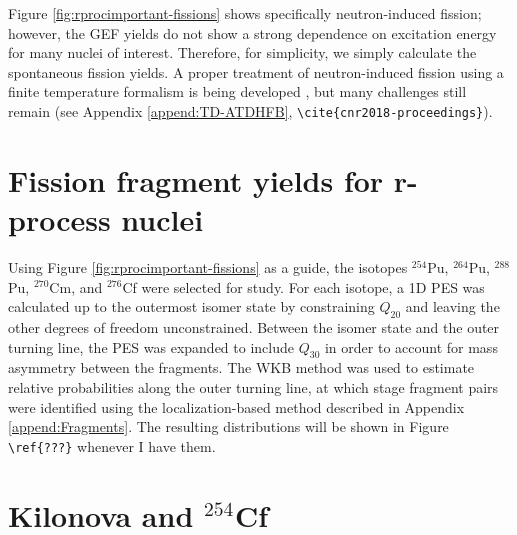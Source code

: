 Figure \ref{fig:rprocimportant-fissions} shows specifically neutron-induced fission; however, the GEF yields do not show a strong dependence on excitation energy for many nuclei of interest. Therefore, for simplicity, we simply calculate the spontaneous fission yields. A proper treatment of neutron-induced fission using a finite temperature formalism is being developed \cite{Mcdonnell2014, Schunck2014, Schunck2015b}, but many challenges still remain (see Appendix \ref{append:TD-ATDHFB}, \verb|\cite{cnr2018-proceedings}|).


\section{Fission fragment yields for r-process nuclei}

Using Figure \ref{fig:rprocimportant-fissions} as a guide, the isotopes $^{254}$Pu, $^{264}$Pu, $^{288}$Pu, $^{270}$Cm, and $^{276}$Cf were selected for study. For each isotope, a 1D PES was calculated up to the outermost isomer state by constraining $Q_{20}$ and leaving the other degrees of freedom unconstrained. Between the isomer state and the outer turning line, the PES was expanded to include $Q_{30}$ in order to account for mass asymmetry between the fragments. The WKB method was used to estimate relative probabilities along the outer turning line, at which stage fragment pairs were identified using the localization-based method described in Appendix \ref{append:Fragments}. The resulting distributions will be shown in Figure \verb|\ref{???}| whenever I have them.


\section{Kilonova and $^{254}$Cf}

